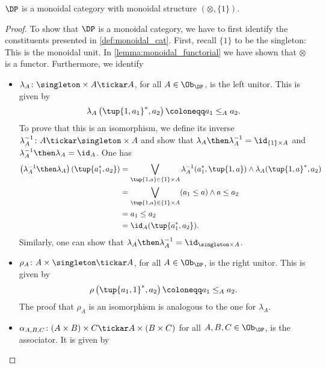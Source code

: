 \begin{lemma}
$\DP$ is a monoidal category with monoidal structure $\left(\otimes, \{1\}\right)$.
\end{lemma}
\begin{proof}
To show that $\DP$ is a monoidal category, we have to first identify the constituents presented in \cref{def:monoidal_cat}. First, recall $\{1\}$ to be the singleton: This is the monoidal unit. In \cref{lemma:monoidal_functorial} we have shown that $\otimes$ is a functor. Furthermore, we identify
\begin{itemize}
    \item $\lambda_A \colon \singleton \times A \tickar A$, for all $A\in \Ob_\DP$, is the left unitor. This is given by
    \begin{equation}
        \lambda_A\left( \tup{1,a_1}^*,a_2\right)\coloneqq a_1\leq_A a_2.
    \end{equation}
    To prove that this is an isomorphism, we define its inverse $\lambda_A^{-1}\colon A\tickar \singleton \times A$ and show that $\lambda_A\then \lambda_A^{-1}=\id_{\{1\}\times A}$ and $\lambda_A^{-1}\then \lambda_A=\id_{A}$. One has
    \begin{equation}
        \begin{aligned}
           \left( \lambda_A^{-1}\then \lambda_A\right)(\tup{a_1^*,a_2})&= \bigvee_{\tup{1,a}\in  \{1\}\times A} \lambda_A^{-1}(a_1^*,\tup{1,a})\wedge \lambda_A(\tup{1,a}^*,a_2)\\
           &= \bigvee_{\tup{1,a}\in  \{1\}\times A}(a_1\leq a) \wedge a\leq a_2\\
           &=a_1\leq a_2\\
           &=\id_A(\tup{a_1^*,a_2}).
        \end{aligned}
    \end{equation}
    Similarly, one can show that $\lambda_A\then \lambda_A^{-1}=\id_{\singleton \times A}$.
    \item $\rho_A\colon A \times \singleton \tickar A$, for all $A\in \Ob_\DP$, is the right unitor. This is given by 
    \begin{equation}
        \rho\left( \tup{a_1,1}^*,a_2\right)\coloneqq a_1\leq_A a_2.
    \end{equation}
    The proof that $\rho_A$ is an isomorphism is analogous to the one for $\lambda_A$.
    \item $\alpha_{A,B,C}\colon (A\times B)\times C \tickar A \times (B\times C)$ for all $A,B,C \in \Ob_\DP$, is the associator. It is given by
    \begin{equation}

\end{equation}
\end{itemize}
\end{proof}
